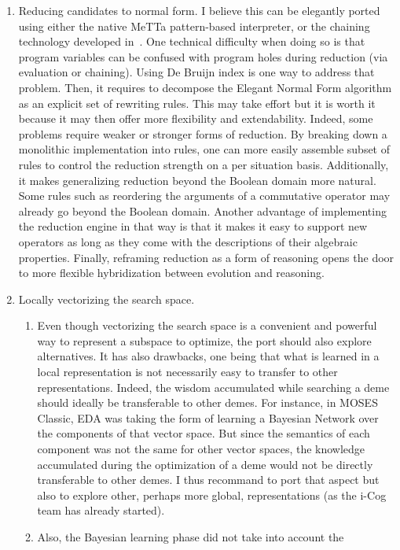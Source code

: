 \documentclass[]{report}
\begin{document}
\begin{enumerate}
\item Reducing candidates to normal form.  I believe this can be
  elegantly ported using either the native MeTTa pattern-based
  interpreter, or the chaining technology developed
  in~\cite{Chaining}.  One technical difficulty when doing so is that
  program variables can be confused with program holes during
  reduction (via evaluation or chaining).  Using De Bruijn index is
  one way to address that problem.  Then, it requires to decompose the
  Elegant Normal Form algorithm as an explicit set of rewriting rules.
  This may take effort but it is worth it because it may then offer
  more flexibility and extendability.  Indeed, some problems require
  weaker or stronger forms of reduction.  By breaking down a
  monolithic implementation into rules, one can more easily assemble
  subset of rules to control the reduction strength on a per situation
  basis.  Additionally, it makes generalizing reduction beyond the
  Boolean domain more natural.  Some rules such as reordering the
  arguments of a commutative operator may already go beyond the
  Boolean domain.  Another advantage of implementing the reduction
  engine in that way is that it makes it easy to support new operators
  as long as they come with the descriptions of their algebraic
  properties.  Finally, reframing reduction as a form of reasoning
  opens the door to more flexible hybridization between evolution and
  reasoning.
\item Locally vectorizing the search space.
\begin{enumerate}
\item Even though vectorizing the search space is a convenient and
  powerful way to represent a subspace to optimize, the port should
  also explore alternatives.  It has also drawbacks, one being that
  what is learned in a local representation is not necessarily easy to
  transfer to other representations.  Indeed, the wisdom accumulated
  while searching a deme should ideally be transferable to other
  demes.  For instance, in MOSES Classic, EDA was taking the form of
  learning a Bayesian Network over the components of that vector
  space.  But since the semantics of each component was not the same
  for other vector spaces, the knowledge accumulated during the
  optimization of a deme would not be directly transferable to other
  demes.  I thus recommand to port that aspect but also to explore
  other, perhaps more global, representations (as the i-Cog team has
  already started).
\item Also, the Bayesian learning phase did not take into account the

\end{enumerate}
\end{enumerate}
\end{document}
